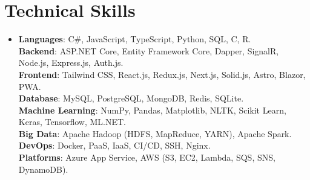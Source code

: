 \documentclass[12pt,a4paper]{article}
\begin{document}
\section{Technical Skills}
 \begin{itemize}[leftmargin=0in, label={}]
    \item{
     \textbf{Languages}{: C\#, JavaScript, TypeScript, Python, SQL, C, R.} \\
     \textbf{Backend}{: ASP.NET Core, Entity Framework Core, Dapper, SignalR, Node.js, Express.js, Auth.js.} \\
     \textbf{Frontend}{: Tailwind CSS, React.js, Redux.js, Next.js, Solid.js, Astro, Blazor, PWA.} \\
     \textbf{Database}{: MySQL, PostgreSQL, MongoDB, Redis, SQLite.} \\
     \textbf{Machine Learning}{: NumPy, Pandas, Matplotlib, NLTK, Scikit Learn, Keras, Tensorflow, ML.NET.} \\
     \textbf{Big Data}{: Apache Hadoop (HDFS, MapReduce, YARN), Apache Spark.} \\
     \textbf{DevOps}{: Docker, PaaS, IaaS, CI/CD, SSH, Nginx.} \\
     \textbf{Platforms}{: Azure App Service, AWS (S3, EC2, Lambda, SQS, SNS, DynamoDB).} \\
    }
 \end{itemize}
 \vspace{-16pt}

\end{document}
